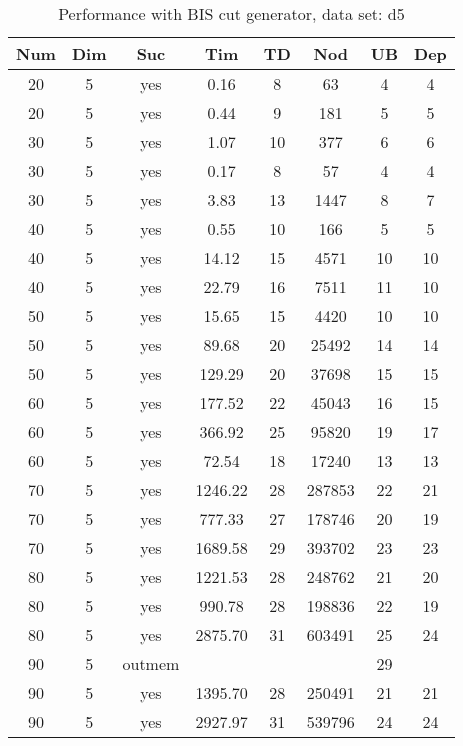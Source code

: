 \begin{table}[!htb]
  \centering
  \begin{tabular}[center]{|c|c|c|c|c|c|c|c|}
    \hline
    Num & Dim & Suc & Tim & TD & Nod & UB & Dep \\
    \hline
    20 & 5 & yes & 0.16 & 8 & 63 & 4 & 4 \\
    20 & 5 & yes & 0.44 & 9 & 181 & 5 & 5 \\
    30 & 5 & yes & 1.07 & 10 & 377 & 6 & 6 \\
    30 & 5 & yes & 0.17 & 8 & 57 & 4 & 4 \\
    30 & 5 & yes & 3.83 & 13 & 1447 & 8 & 7 \\
    40 & 5 & yes & 0.55 & 10 & 166 & 5 & 5 \\
    40 & 5 & yes & 14.12 & 15 & 4571 & 10 & 10 \\
    40 & 5 & yes & 22.79 & 16 & 7511 & 11 & 10 \\
    50 & 5 & yes & 15.65 & 15 & 4420 & 10 & 10 \\
    50 & 5 & yes & 89.68 & 20 & 25492 & 14 & 14 \\
    50 & 5 & yes & 129.29 & 20 & 37698 & 15 & 15 \\
    60 & 5 & yes & 177.52 & 22 & 45043 & 16 & 15 \\
    60 & 5 & yes & 366.92 & 25 & 95820 & 19 & 17 \\
    60 & 5 & yes & 72.54 & 18 & 17240 & 13 & 13 \\
    70 & 5 & yes & 1246.22 & 28 & 287853 & 22 & 21 \\
    70 & 5 & yes & 777.33 & 27 & 178746 & 20 & 19 \\
    70 & 5 & yes & 1689.58 & 29 & 393702 & 23 & 23 \\
    80 & 5 & yes & 1221.53 & 28 & 248762 & 21 & 20 \\
    80 & 5 & yes & 990.78 & 28 & 198836 & 22 & 19 \\
    80 & 5 & yes & 2875.70 & 31 & 603491 & 25 & 24 \\
    90 & 5 & outmem &&&& 29 &\\
    90 & 5 & yes & 1395.70 & 28 & 250491 & 21 & 21 \\
    90 & 5 & yes & 2927.97 & 31 & 539796 & 24 & 24 \\
    \hline
  \end{tabular}
  \caption{Performance with BIS cut generator, data set: d5}
  \label{tab:test.cutbis-d5}
\end{table}

